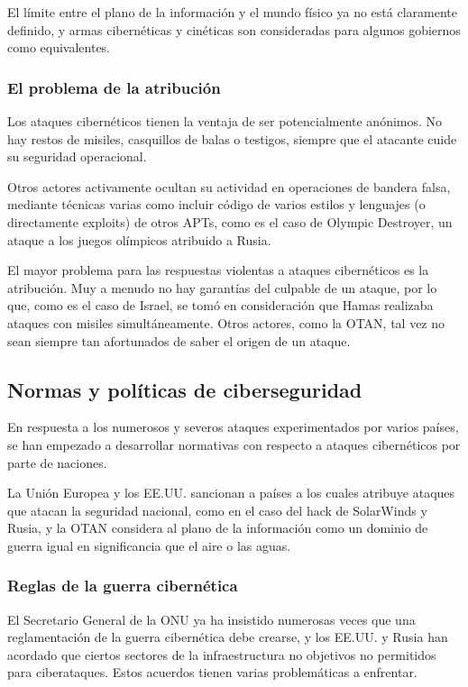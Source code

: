 \documentclass{article}
\begin{document}
El límite entre el plano de la información y el mundo físico ya no está claramente definido, y armas cibernéticas y cinéticas son consideradas para algunos gobiernos como equivalentes.

\subsubsection{El problema de la atribución}
Los ataques cibernéticos tienen la ventaja de ser potencialmente anónimos. No hay restos de misiles, casquillos de balas o testigos, siempre que el atacante cuide su seguridad operacional.

Otros actores activamente ocultan su actividad en operaciones de bandera falsa, mediante técnicas varias como incluir código de varios estilos y lenguajes (o directamente exploits) de otros APTs, como es el caso de Olympic Destroyer, un ataque a los juegos olímpicos atribuido a Rusia. \autocite{wired-olympic-destroyer}

El mayor problema para las respuestas violentas a ataques cibernéticos es la atribución. Muy a menudo no hay garantías del culpable de un ataque, por lo que, como es el caso de Israel, se tomó en consideración que Hamas realizaba ataques con misiles simultáneamente. Otros actores, como la OTAN, tal vez no sean siempre tan afortunados de saber el origen de un ataque. \autocite{pcmag-cyberwar}

\subsection{Normas y políticas de ciberseguridad}
En respuesta a los numerosos y severos ataques experimentados por varios países, se han empezado a desarrollar normativas con respecto a ataques cibernéticos por parte de naciones.

La Unión Europea y los EE.UU. sancionan a países a los cuales atribuye ataques que atacan la seguridad nacional, como en el caso del hack de SolarWinds y Rusia, y la OTAN considera al plano de la información como un dominio de guerra igual en significancia que el aire o las aguas. \autocite{cnbc-solarwinds} \autocite{eu-cyberattacks}

\subsubsection{Reglas de la guerra cibernética}
El Secretario General de la ONU ya ha insistido numerosas veces que una reglamentación de la guerra cibernética debe crearse, y los EE.UU. y Rusia han acordado que ciertos sectores de la infraestructura no objetivos no permitidos para ciberataques. Estos acuerdos tienen varias problemáticas a enfrentar. \autocite{cfr-regulations}
\end{document}
